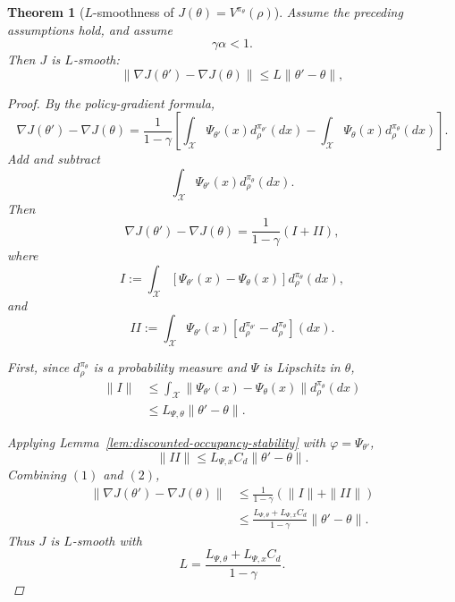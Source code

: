 \documentclass{article}
\newtheorem{thm}{Theorem}[section]
\theoremstyle{definition}
\theoremstyle{remark}
\theoremstyle{mystyle}
\newcommand{\1}{\mathbbm{1}}
\begin{document}
\begin{thm}[\(L\)-smoothness of \(J(\theta)=V^{\pi_\theta}(\rho)\)]

Assume the preceding assumptions hold, and assume
\[
\gamma\alpha<1.
\tag{C}
\]
Then \(J\) is \(L\)-smooth:
\[
\|\nabla J(\theta')-\nabla J(\theta)\|
\le
L\|\theta'-\theta\|,
\]


\begin{proof}
By the policy-gradient formula,
\[
\nabla J(\theta')
-
\nabla J(\theta)
=
\frac{1}{1-\gamma}
\left[
\int_{\mathcal X}\Psi_{\theta'}(x)d_\rho^{\pi_{\theta'}}(dx)
-
\int_{\mathcal X}\Psi_\theta(x)d_\rho^{\pi_\theta}(dx)
\right].
\]
Add and subtract
\[
\int_{\mathcal X}\Psi_{\theta'}(x)d_\rho^{\pi_\theta}(dx).
\]
Then
\[
\nabla J(\theta')-\nabla J(\theta)
=
\frac{1}{1-\gamma}(I+II),
\]
where
\[
I
:=
\int_{\mathcal X}
\left[
\Psi_{\theta'}(x)-\Psi_\theta(x)
\right]d_\rho^{\pi_\theta}(dx),
\]
and
\[
II
:=
\int_{\mathcal X}
\Psi_{\theta'}(x)
\left[
d_\rho^{\pi_{\theta'}}-d_\rho^{\pi_\theta}
\right](dx).
\]

First, since \(d_\rho^{\pi_\theta}\) is a probability measure and \(\Psi\) is Lipschitz in \(\theta\),
\[
\begin{aligned}
\|I\|
&\le
\int_{\mathcal X}
\|\Psi_{\theta'}(x)-\Psi_\theta(x)\|d_\rho^{\pi_\theta}(dx)
\\
&\le
L_{\Psi,\theta}\|\theta'-\theta\|.
\end{aligned}
\tag{1}
\]

Applying Lemma~\ref{lem:discounted-occupancy-stability} with
\(\varphi=\Psi_{\theta'}\),
\[
\|II\|
\le
L_{\Psi,x}C_d\|\theta'-\theta\|.
\tag{2}
\]
Combining \((1)\) and \((2)\),
\[
\begin{aligned}
\|\nabla J(\theta')-\nabla J(\theta)\|
&\le
\frac{1}{1-\gamma}
\left(
\|I\|+\|II\|
\right)
\\
&\le
\frac{L_{\Psi,\theta}+L_{\Psi,x}C_d}{1-\gamma}
\|\theta'-\theta\|.
\end{aligned}
\]
Thus \(J\) is \(L\)-smooth with
\[
L
=
\frac{L_{\Psi,\theta}+L_{\Psi,x}C_d}{1-\gamma}.
\]
\end{proof}
\end{thm}
\end{document}
